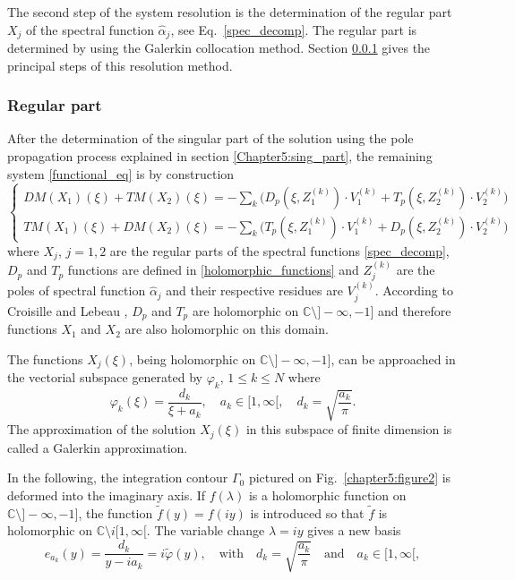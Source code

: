 The second step of the system resolution is the determination of the regular part $X_j$ of the spectral function $\hat{\alpha}_j$, see Eq.~\eqref{spec_decomp}. The regular part is determined by using the Galerkin collocation method. Section \ref{Chapter5:regular_part} gives the principal steps of this resolution method. 

\subsubsection{Regular part}
\label{Chapter5:regular_part}

After the determination of the singular part of the solution using the pole propagation process explained in section \ref{Chapter5:sing_part}, the remaining system \ref{functional_eq} is by construction
\begin{equation}
\label{sys_regular}
\begin{cases}
DM(X_1)(\xi) + TM(X_2)(\xi) = -\underset{k}{\sum} \Big( D_p(\xi,Z_1^{(k)})\cdot V_1^{(k)}+ T_p(\xi,Z_2^{(k)})\cdot V_2^{(k)}\Big)\\
TM(X_1)(\xi) + DM(X_2)(\xi)  =  -\underset{k}{\sum} \Big( T_p(\xi,Z_1^{(k)})\cdot V_1^{(k)}+ D_p(\xi,Z_2^{(k)})\cdot V_2^{(k)}\Big)
\end{cases}
\end{equation}
where $X_j$, $j=1,2$ are the regular parts of the spectral functions \eqref{spec_decomp}, $D_p$ and $T_p$ functions are defined in \eqref{holomorphic_functions} and $Z_j^{(k)}$ are the poles of spectral function $\hat{\alpha}_j$  and their respective residues are $V_j^{(k)}$. According to Croisille and Lebeau \cite{CroisilleLebeau}, $D_p$ and $T_p$ are holomorphic on $\mathbb{C}\setminus  ]-\infty,-1]$ and therefore functions $X_1$ and $X_2$ are also holomorphic on this domain.

The functions $X_j(\xi)$, being holomorphic on $\mathbb{C}\setminus  ]-\infty,-1]$, can be approached in the vectorial subspace generated by $\varphi_k, \, 1 \leq k \leq N$ where
\begin{equation}
\label{Gal_basis}
\varphi_k(\xi) = \dfrac{d_k}{\xi + a_k}, \quad a_k \in [1,\infty[, \quad d_k=\sqrt{\frac{a_k}{\pi}}.
\end{equation}
The approximation of the solution $X_j(\xi)$ in this subspace of finite dimension is called a Galerkin approximation.

In the following, the integration contour $\Gamma_0$ pictured on Fig.~\ref{chapter5:figure2} is deformed into the imaginary axis. If $f(\lambda)$ is a holomorphic function on $\mathbb{C}\setminus  ]-\infty,-1]$, the function $\tilde f (y)=f(iy)$ is introduced so that $\tilde f$ is holomorphic on $\mathbb{C}\setminus i [1,\infty[ $. The variable change $\lambda = iy$ gives a new basis
\begin{equation}
\label{Galerkin_basis}
e_{a_k}(y) = \dfrac{d_k}{y-i{a_k}}=i\tilde \varphi(y), \quad \text{with} \quad d_k=\sqrt{\frac{a_k}{\pi}} \quad \text{and} \quad a_k \in [1,\infty[,
\end{equation}

